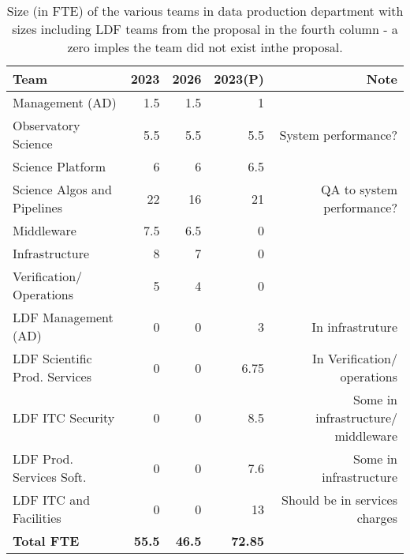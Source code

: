  \begin{longtable} { |p{}  |r  |r  |r  |r |} 
\caption{Size (in \gls{FTE}) of the various teams in data production department with sizes including \gls{LDF} teams from the proposal in the fourth column - a zero imples the team did not exist inthe proposal. \label{tab:FTE}}\\ 
\hline 
\textbf{Team}&\textbf{2023}&\textbf{2026}&\textbf{2023(P)}&\textbf{Note} \\ \hline
{Management (\gls{AD})}&{1.5}&{1.5}&{1}& \\ \hline
{Observatory Science }&{5.5}&{5.5}&{5.5}&{System performance?} \\ \hline
{Science Platform}&{6}&{6}&{6.5}& \\ \hline
{Science Algos and Pipelines}&{22}&{16}&{21}&{QA  to system performance?} \\ \hline
{Middleware}&{7.5}&{6.5}&{0}& \\ \hline
{Infrastructure}&{8}&{7}&{0}&{ } \\ \hline
{Verification/ Operations}&{5}&{4}&{0}& \\ \hline
{LDF Management (\gls{AD}) }&{0}&{0}&{3}&{In infrastruture} \\ \hline
{LDF Scientific Prod. Services}&{0}&{0}&{6.75}&{In Verification/ operations} \\ \hline
{LDF \gls{ITC} Security}&{0}&{0}&{8.5}&{Some in infrastructure/ middleware } \\ \hline
{LDF Prod. Services Soft.}&{0}&{0}&{7.6}&{Some in infrastructure} \\ \hline
{LDF \gls{ITC} and Facilities}&{0}&{0}&{13}&{Should be in services charges} \\ \hline
\textbf{Total  FTE}&\textbf{55.5}&\textbf{46.5}&\textbf{72.85}& \\ \hline
\end{longtable}
